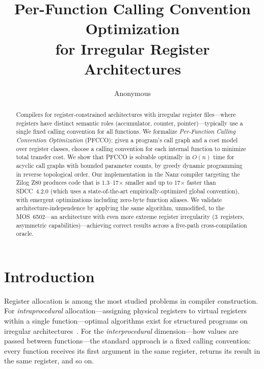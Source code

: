 \documentclass[sigplan,screen,nonacm]{acmart}
\begin{document}
\title{Per-Function Calling Convention Optimization\\for Irregular Register Architectures}

\author{Anonymous}

\begin{abstract}
Compilers for register-constrained architectures with irregular register
files---where registers have distinct semantic roles (accumulator, counter,
pointer)---typically use a single fixed calling convention for all functions.
We formalize \emph{Per-Function Calling Convention Optimization} (PFCCO):
given a program's call graph and a cost model over register classes, choose
a calling convention for each internal function to minimize total transfer
cost.  We show that PFCCO is solvable optimally in $O(n)$ time for acyclic
call graphs with bounded parameter counts, by greedy dynamic programming in
reverse topological order.  Our implementation in the Nanz compiler
targeting the Zilog Z80 produces code that is 1.3--17$\times$ smaller and
up to 17$\times$ faster than SDCC~4.2.0 (which uses a state-of-the-art
empirically-optimized global convention), with emergent optimizations
including zero-byte function aliases.  We validate architecture-independence
by applying the same algorithm, unmodified, to the MOS~6502---an
architecture with even more extreme register irregularity (3~registers,
asymmetric capabilities)---achieving correct results across a five-path
cross-compilation oracle.
\end{abstract}


\maketitle

\section{Introduction}
\label{sec:intro}

Register allocation is among the most studied problems in compiler
construction.  For \emph{intraprocedural} allocation---assigning physical
registers to virtual registers within a single function---optimal algorithms
exist for structured programs on irregular architectures~\cite{krause2013}.
For the \emph{interprocedural} dimension---how values are passed between
functions---the standard approach is a fixed calling convention: every
function receives its first argument in the same register, returns its
result in the same register, and so on.
\end{document}
